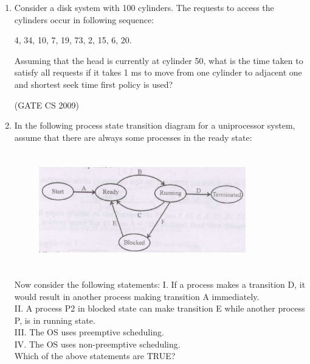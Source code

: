 \documentclass[a4paper, 11pt]{article}
\begin{document}
\begin{enumerate}
    \item Consider a disk system with 100 cylinders. The requests to access the cylinders occur in following sequence:
    \begin{center}
        4, 34, 10, 7, 19, 73, 2, 15, 6, 20.
    \end{center}
    Assuming that the head is currently at cylinder 50, what is the time taken to satisfy all requests if it takes 1 ms to move from one cylinder to adjacent one and shortest seek time first policy is used?\\
    \begin{enumerate}
    \end{enumerate}

    \hfill (GATE CS 2009)

    \item In the following process state transition diagram for a uniprocessor system, assume that there are always some processes in the ready state:\\
    \begin{figure}[H]
        \centering
        \includegraphics[width=9cm , height= 5cm]{figs/q32.png}
        \caption{}
        \label{fig:placeholder}
    \end{figure}

    Now consider the following statements:
    I. If a process makes a transition D, it would result in another process making transition A immediately.\\
    II. A process P2 in blocked state can make transition E while another process P, is in running state. \\
    III.  The OS uses preemptive scheduling. \\
    IV. The OS uses non-preemptive scheduling.\\
    Which of the above statements are TRUE?\\


\end{enumerate}
\end{document}
